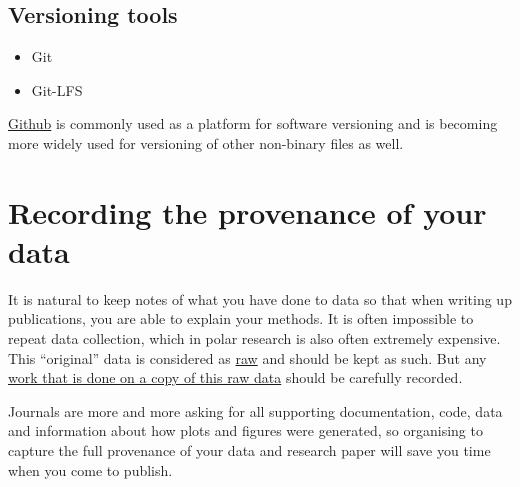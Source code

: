 \documentclass[12pt,a4paper,oneside]{report}
\providecommand{\tightlist}{%
  \setlength{\itemsep}{0pt}\setlength{\parskip}{0pt}}
\begin{document}
\hypertarget{versioning-tools}{%
\subsection{Versioning tools}\label{versioning-tools}}

\begin{itemize}
\tightlist
\item
  Git
\item
  Git-LFS
\end{itemize}

\href{https://github.com/}{Github} is commonly used as a platform for
software versioning and is becoming more widely used for versioning of
other non-binary files as well.

\hypertarget{recording-the-provenance-of-your-data}{%
\section{Recording the provenance of your
data}\label{recording-the-provenance-of-your-data}}

It is natural to keep notes of what you have done to data so that when
writing up publications, you are able to explain your methods. It is
often impossible to repeat data collection, which in polar research is
also often extremely expensive. This ``original'' data is considered as
\protect\hyperlink{raw-data}{raw} and should be kept as such. But any
\protect\hyperlink{work-on-a-copy-of-your-raw-data}{work that is done on
a copy of this raw data} should be carefully recorded.

Journals are more and more asking for all supporting documentation,
code, data and information about how plots and figures were generated,
so organising to capture the full provenance of your data and research
paper will save you time when you come to publish.
\end{document}
